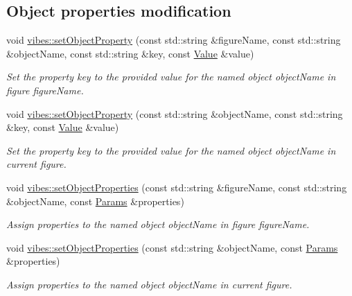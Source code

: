 \subsection*{Object properties modification}
\begin{DoxyCompactItemize}
\item 
\mbox{\label{group__drawing_gaec9511af44b50c7f5bad3ea1dcebeb85}} 
void \hyperlink{group__drawing_gaec9511af44b50c7f5bad3ea1dcebeb85}{vibes\+::set\+Object\+Property} (const std\+::string \&figure\+Name, const std\+::string \&object\+Name, const std\+::string \&key, const \hyperlink{classvibes_1_1_value}{Value} \&value)
\begin{DoxyCompactList}\small\item\em Set the property {\itshape key} to the provided {\itshape value} for the named object {\itshape object\+Name} in figure {\itshape figure\+Name}. \end{DoxyCompactList}\item 
\mbox{\label{group__drawing_ga8b6e96cfeb43d967950940fa388b5574}} 
void \hyperlink{group__drawing_ga8b6e96cfeb43d967950940fa388b5574}{vibes\+::set\+Object\+Property} (const std\+::string \&object\+Name, const std\+::string \&key, const \hyperlink{classvibes_1_1_value}{Value} \&value)
\begin{DoxyCompactList}\small\item\em Set the property {\itshape key} to the provided {\itshape value} for the named object {\itshape object\+Name} in current figure. \end{DoxyCompactList}\item 
\mbox{\label{group__drawing_ga62444280a2ae27683063e4229d966da6}} 
void \hyperlink{group__drawing_ga62444280a2ae27683063e4229d966da6}{vibes\+::set\+Object\+Properties} (const std\+::string \&figure\+Name, const std\+::string \&object\+Name, const \hyperlink{classvibes_1_1_params}{Params} \&properties)
\begin{DoxyCompactList}\small\item\em Assign {\itshape properties} to the named object {\itshape object\+Name} in figure {\itshape figure\+Name}. \end{DoxyCompactList}\item 
\mbox{\label{group__drawing_ga7e66750e7e8b095c92762f8632a1f954}} 
void \hyperlink{group__drawing_ga7e66750e7e8b095c92762f8632a1f954}{vibes\+::set\+Object\+Properties} (const std\+::string \&object\+Name, const \hyperlink{classvibes_1_1_params}{Params} \&properties)
\begin{DoxyCompactList}\small\item\em Assign {\itshape properties} to the named object {\itshape object\+Name} in current figure. \end{DoxyCompactList}\end{DoxyCompactItemize}



